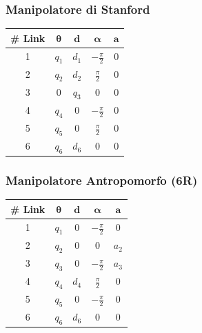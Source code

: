 \documentclass[11pt, a4paper]{report}
\begin{document}
\begin{minipage}[t]{0.48\textwidth}
    \subsubsection*{Manipolatore di Stanford}
    \centering
    \begin{tabular}{|c|c|c|c|c|}
        \hline
        \textbf{\# Link} & \(\boldsymbol{\theta}\) & \(\boldsymbol{d}\) & \(\boldsymbol{\alpha}\) & \(\boldsymbol{a}\) \\
        \hline
        1 & \(q_{1}\) & \(d_{1}\) & \(-\frac{\pi}{2}\) & 0 \\
        \hline
        2 & \(q_{2}\) & \(d_{2}\) & \(\frac{\pi}{2}\) & 0 \\
        \hline
        3 & 0 & \(q_{3}\) & 0 & 0 \\
        \hline
        4 & \(q_{4}\) & 0 & \(-\frac{\pi}{2}\) & 0 \\
        \hline
        5 & \(q_{5}\) & 0 & \(\frac{\pi}{2}\) & 0 \\
        \hline
        6 & \(q_{6}\) & \(d_{6}\) & 0 & 0 \\
        \hline
    \end{tabular}
\end{minipage}
\hfill
\begin{minipage}[t]{0.48\textwidth}
    \subsubsection*{Manipolatore Antropomorfo (6R)}
    \centering
    \begin{tabular}{|c|c|c|c|c|}
        \hline
        \textbf{\# Link} & \(\boldsymbol{\theta}\) & \(\boldsymbol{d}\) & \(\boldsymbol{\alpha}\) & \(\boldsymbol{a}\) \\
        \hline
        1 & \(q_{1}\) & 0 & \(-\frac{\pi}{2}\) & 0 \\
        \hline
        2 & \(q_{2}\) & 0 & 0 & \(a_{2}\) \\
        \hline
        3 & \(q_{3}\) & 0 & \(-\frac{\pi}{2}\) & \(a_{3}\) \\
        \hline
        4 & \(q_{4}\) & \(d_{4}\) & \(\frac{\pi}{2}\) & 0 \\
        \hline
        5 & \(q_{5}\) & 0 & \(-\frac{\pi}{2}\) & 0 \\
        \hline
        6 & \(q_{6}\) & \(d_{6}\) & 0 & 0 \\
        \hline
    \end{tabular}
\end{minipage}
\end{document}

